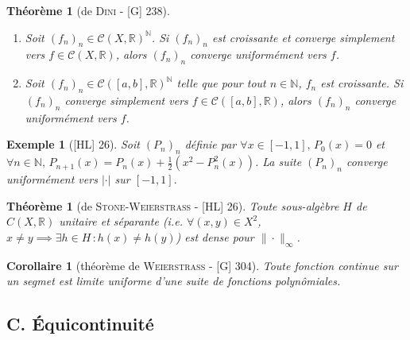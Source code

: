 \documentclass[10pt, a4paper, parskip=full, twoside, twocolumn]{report}
\newtheorem{theorem}[definition]{Théorème}
\newtheorem{corollary}[definition]{Corollaire}
\newtheorem{example}[definition]{Exemple}
\newcommand{\IN}{\mathbb{N}}
\newcommand{\IR}{\mathbb{R}}
\begin{document}
\begin{theorem}[de \textsc{Dini} - \textnormal{[G] 238}]
	\begin{enumerate}
		\item Soit $\left(f_n\right)_{n}\in \mathcal{C}(X,\IR)^{\IN}$. Si $\left(f_n\right)_n$ est croissante et converge simplement vers $f\in\mathcal{C}(X,\IR)$, alors $\left(f_n\right)_n$ converge uniformément vers $f$.
		\item Soit $\left(f_n\right)_n\in\mathcal{C}([a,b],\IR)^{\IN}$ telle que pour tout $n\in\IN$, $f_n$ est croissante. Si $\left(f_n\right)_n$ converge simplement vers $f\in\mathcal{C}([a,b],\IR)$, alors $\left(f_n\right)_n$ converge uniformément vers $f$.
	\end{enumerate}
\end{theorem}

\begin{tcolorbox}[
    breakable, %
    colback=developpement, %
    colframe=gray!0!black, %
    boxrule=0pt, %
    arc=1mm, %
	boxsep=0pt,
	left=0pt, right=0pt, top=0pt, bottom=0pt
]
\begin{example}[\textnormal{[HL] 26}]
	\label{203dev11}
	Soit $\left(P_n\right)_n$ définie par $\forall x \in[-1,1],\, P_0(x)= 0$ et $\forall n\in \IN,\, P_{n+1}(x) = P_n(x) + \frac{1}{2}(x^2 - P_n^2(x))$.
	La suite $\left(P_n\right)_n$ converge uniformément vers $\vert\cdot\vert$ sur $[-1,1]$.
\end{example}
\begin{theorem}[de \textsc{Stone-Weierstrass} - \textnormal{[HL] 26}]
	\label{203dev12}
	Toute sous-algèbre $H$ de $C(X,\IR)$ unitaire et séparante (\emph{i.e.} $\forall (x,y)\in X^2$, $x\neq y\implies \exists h\in H\,\colon h(x)\neq h(y)$)
	est dense pour $\|\cdot\|_{\infty}$.
\end{theorem}
\end{tcolorbox}

\begin{corollary}[théorème de \textsc{Weierstrass} - \textnormal{[G] 304}]
	Toute fonction continue sur un segmet est limite uniforme d'une suite de fonctions polynômiales.
\end{corollary}

\subsection*{C. Équicontinuité}
\end{document}
